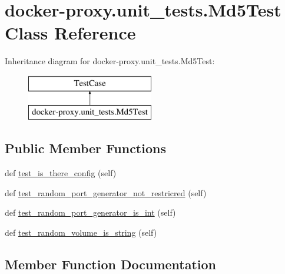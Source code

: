 \hypertarget{classdocker-proxy_1_1unit__tests_1_1_md5_test}{}\section{docker-\/proxy.unit\+\_\+tests.\+Md5\+Test Class Reference}
\label{classdocker-proxy_1_1unit__tests_1_1_md5_test}
Inheritance diagram for docker-\/proxy.unit\+\_\+tests.\+Md5\+Test\+:\begin{figure}[H]
\begin{center}
\leavevmode
\includegraphics[height=2.000000cm]{classdocker-proxy_1_1unit__tests_1_1_md5_test}
\end{center}
\end{figure}
\subsection*{Public Member Functions}
\begin{DoxyCompactItemize}
\item 
def \mbox{\hyperlink{classdocker-proxy_1_1unit__tests_1_1_md5_test_a964cee9ecd446be83cdd9f50ff401203}{test\+\_\+is\+\_\+there\+\_\+config}} (self)
\item 
def \mbox{\hyperlink{classdocker-proxy_1_1unit__tests_1_1_md5_test_ac200f662c944e9c1f857de062fa6bd85}{test\+\_\+random\+\_\+port\+\_\+generator\+\_\+not\+\_\+restricred}} (self)
\item 
def \mbox{\hyperlink{classdocker-proxy_1_1unit__tests_1_1_md5_test_acc4c5dfd97e4925662798cd78a992772}{test\+\_\+random\+\_\+port\+\_\+generator\+\_\+is\+\_\+int}} (self)
\item 
def \mbox{\hyperlink{classdocker-proxy_1_1unit__tests_1_1_md5_test_a7a31a78746cfbad0c3d3a740f8ab50fd}{test\+\_\+random\+\_\+volume\+\_\+is\+\_\+string}} (self)
\end{DoxyCompactItemize}


\subsection{Member Function Documentation}
\mbox{\label{classdocker-proxy_1_1unit__tests_1_1_md5_test_a964cee9ecd446be83cdd9f50ff401203}} 
